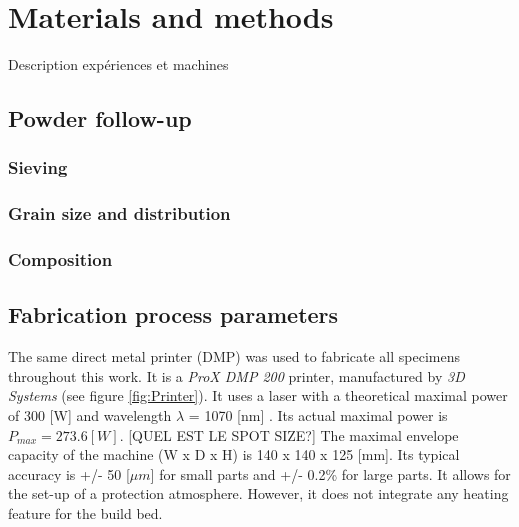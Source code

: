 \chapter{Materials and methods}
\label{Chap3}
Description expériences et machines
\section{Powder follow-up}

\subsection{Sieving}

\subsection{Grain size and distribution}

\subsection{Composition}


\section{Fabrication process parameters}
\label{MMFPP}
The same direct metal printer (DMP) was used to fabricate all specimens throughout this work. It is a \textit{ProX DMP 200} printer, manufactured by \textit{3D Systems} (see figure \ref{fig:Printer}). It uses a laser with a theoretical maximal power of 300 [W] and wavelength $\lambda$ = 1070 [nm] \parencite{3D}. Its actual maximal power is $P_{max}=273.6 [W]$. [QUEL EST LE SPOT SIZE?]  The maximal envelope capacity of the machine (W x D x H) is 140 x 140 x 125 [mm]. Its typical accuracy is +/- 50 [$\mu m$] for small parts and +/- 0.2\% for large parts. It allows for the set-up of a protection atmosphere. However, it does not integrate any heating feature for the build bed.\\

